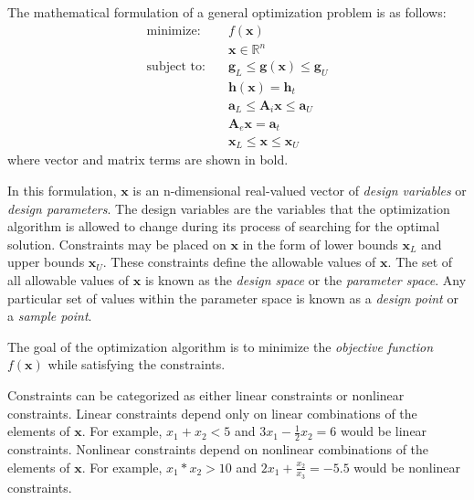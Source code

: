 The mathematical formulation of a general optimization problem is as follows:
\begin{equation}\begin{split}\label{eq:bg:opt:optimization_problem}
  \mbox{minimize:}  \quad & f\left(\textbf{x}\right) \\
                          & \textbf{x} \in \mathbb{R}^n \\
  \mbox{subject to:}\quad & \textbf{g}_L \leq \textbf{g}\left(\textbf{x}\right) \leq \textbf{g}_U \\
                          & \textbf{h}\left(\textbf{x}\right) = \textbf{h}_t \\
                          & \textbf{a}_L \leq \textbf{A}_i\textbf{x} \leq \textbf{a}_U \\
                          & \textbf{A}_e\textbf{x} = \textbf{a}_t \\
                          & \textbf{x}_L \leq \textbf{x} \leq \textbf{x}_U
\end{split}\end{equation}
where vector and matrix terms are shown in bold.

In this formulation, $\textbf{x}$ is an n-dimensional real-valued vector of \textit{design variables} or \textit{design parameters}.
The design variables are the variables that the optimization algorithm is allowed to change during its process of searching for the optimal solution.
Constraints may be placed on $\textbf{x}$ in the form of lower bounds $\textbf{x}_L$ and upper bounds $\textbf{x}_U$.
These constraints define the allowable values of $\textbf{x}$.
The set of all allowable values of $\textbf{x}$ is known as the \textit{design space} or the \textit{parameter space}.
Any particular set of values within the parameter space is known as a \textit{design point} or a \textit{sample point}.

The goal of the optimization algorithm is to minimize the \textit{objective function} $f\left(\textbf{x}\right)$ while satisfying the constraints.

Constraints can be categorized as either linear constraints or nonlinear constraints.
Linear constraints depend only on linear combinations of the elements of $\textbf{x}$.
For example, $x_1 + x_2 < 5$ and $3x_1 - \frac{1}{2}x_2 = 6$ would be linear constraints.
Nonlinear constraints depend on nonlinear combinations of the elements of $\textbf{x}$.
For example, $x_1 * x_2 > 10$ and $2x_1 + \frac{x_2}{x_3} = -5.5$ would be nonlinear constraints.

